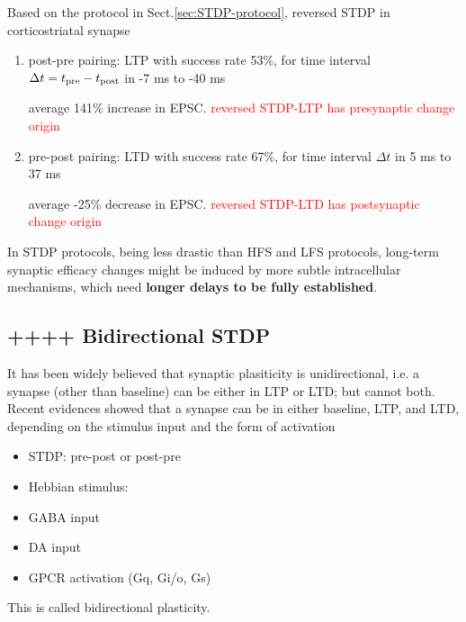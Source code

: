 Based on the protocol in Sect.\ref{sec:STDP-protocol}, reversed STDP in
corticostriatal synapse 
\begin{enumerate}
  \item post-pre pairing: LTP with success rate 53\%, for
  time interval $\Delta t = t_{{\text{pre}}} - t_{{\text{post}}}$ in -7 ms to -40 ms
  
  average 141\% increase in EPSC. 
  \textcolor{red}{reversed STDP-LTP has presynaptic change origin }
  
  \item pre-post pairing: LTD with  success rate 67\%, for time interval
  $\Delta t	$ in 5 ms to 37 ms
  
  average -25\% decrease in EPSC.
  \textcolor{red}{reversed STDP-LTD has postsynaptic change origin }

\end{enumerate}

In STDP protocols, being less drastic than HFS and LFS protocols, long-term
synaptic efficacy changes might be induced by more subtle intracellular
mechanisms, which need {\bf longer delays to be fully established}.




\subsection{++++ Bidirectional STDP}
\label{sec:STDP-bidirectional}

It has been widely believed that synaptic plasiticity is unidirectional, i.e.
a synapse (other than baseline) can be either in LTP or LTD; but cannot
both. Recent evidences showed that a synapse can be in either
baseline, LTP, and LTD, depending on the stimulus input and the form of
activation
\begin{itemize}
  \item STDP: pre-post or post-pre
  \item Hebbian stimulus:
  \item GABA input
  \item DA input
  \item GPCR activation (Gq, Gi/o, Gs) 
\end{itemize}
This is called bidirectional plasticity.

